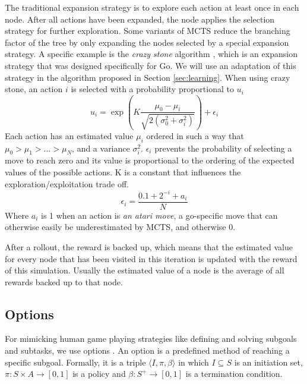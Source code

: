 The traditional expansion strategy is to explore each action at least once in
each node. After all actions have been expanded, the node applies the selection
strategy for further exploration. Some variants of MCTS reduce the branching
factor of the tree by only expanding the nodes selected by a special expansion
strategy. A specific example is the \emph{crazy stone} algorithm
\cite{coulom2007efficient}, which is an expansion strategy that was designed
specifically for Go. We will use an adaptation of this strategy in the algorithm
proposed in Section \ref{sec:learning}.  When using crazy stone, an action $i$
is selected with a probability proportional to $u_i$
\begin{equation}
	\label{eq:crazystone}
	u_i = \exp\left(K \frac{\mu_0 - \mu_i}{\sqrt{2\left(\sigma_0^2 +
\sigma_i^2\right)}}\right) + \epsilon_i
\end{equation}
Each action has an estimated value $\mu_i$ ordered in such a way that $\mu_0 >
\mu_1 > \ldots > \mu_N$, and a variance $\sigma_i^2$. $\epsilon_i$ prevents 
the probability of selecting a move to reach zero and its value is proportional to
the ordering of the expected values of the possible actions. K is a constant
that influences the exploration/exploitation trade off.
\begin{equation}
	\label{eq:epsilon}
	\epsilon_i = \frac{0.1 + 2^{-i} + a_i}{N}
\end{equation}
Where $a_i$ is 1 when an action is \emph{an atari move}, a go-specific
move that can otherwise easily be underestimated by MCTS, and otherwise 0.

After a rollout, the reward is backed up, which means that the estimated value
for every node that has been visited in this iteration is updated with the
reward of this simulation. Usually the estimated value of a node is the average
of all rewards backed up to that node.

\subsection{Options}
\label{subsec:options}
For mimicking human game playing strategies like defining and solving subgoals
and subtasks, we use options \cite{sutton1999between, barto2003recent}. An
option is a predefined method of reaching a specific subgoal. Formally, it is a
triple $\langle I, \pi, \beta\rangle$ in which $I \subseteq S$ is an initiation
set, $\pi: S \times A \rightarrow [0, 1]$ is a policy and $\beta: S^+
\rightarrow[0,1]$ is a termination condition.

